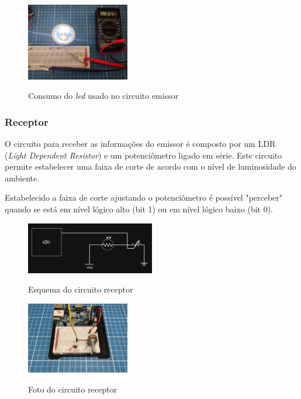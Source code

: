 \begin{figure}[!htbp]
  \caption{Consumo do \textit{led} usado no circuito emissor}
  \includegraphics[width=0.4\textwidth]{images/consumo_led.jpg}
  \label{corrente_led}
\end{figure}


\subsubsection{Receptor}

O circuito para receber as informações do emissor é composto por um LDR (\textit{Light Dependent Resistor}) e um potenciômetro ligado em série. Este circuito permite estabelecer uma faixa de corte de acordo com o nível de luminosidade do ambiente.

Estabelecido a faixa de corte ajustando o potenciômetro é possível "perceber" quando se está em nível lógico alto (bit 1) ou em nível lógico baixo (bit 0).


\begin{figure}[!htbp]
  \caption{Esquema do circuito receptor}
  \includegraphics[width=0.5\textwidth]{images/esquema_circuito_receptor.png}
  \label{esquema-circuito-receptor}
\end{figure}


\begin{figure}[!htbp]
  \caption{Foto do circuito receptor}
  \includegraphics[width=0.4\textwidth]{images/foto_circuito_receptor.jpg}
  \label{foto-circuito-receptor}
\end{figure}

